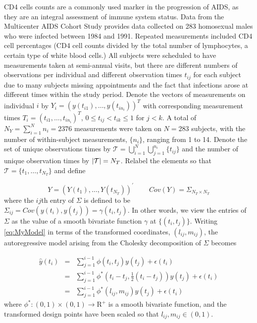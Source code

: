 CD4 cells counts are a commonly used marker in the progression of AIDS, as they are an integral assessment of immune system status. Data from the Multicenter AIDS Cohort Study provides data collected on 283 homosexual males who were infected between 1984 and 1991. Repeated measurements included CD4 cell percentages (CD4 cell counts divided by the total number of lymphocytes, a certain type of white blood cells.) All subjects were scheduled to have measurements taken at semi-annual visits, but there are different numbers of observations per individual and different observation times $t_{ij}$ for each subject due to many subjects missing appointments and the fact that infections arose at different times within the study period.  Denote the vectors of measurements on individual $i$ by $Y_i = \left( y\left(t_{i1}\right), \dots, y\left(t_{i n_i}\right) \right)^T$ with corresponding measurement times  $T_i = \left(t_{i1},\dots, t_{i n_i}  \right)^T$, $0 \le t_{ij} < t_{ik} \le 1$ for $j < k$. A total of $N_Y = \sum_{i=1}^N n_i = 2376$ measurements were taken on $N=283$ subjects, with the number of within-subject measurements, $\lbrace n_i \rbrace$, ranging from 1 to 14.  Denote the set of unique observations times by $ \mathcal{T} = \bigcup_{i=1}^N \bigcup_{j=1}^{n_i} \lbrace t_{ij} \rbrace$ and the number of unique observation times by $\vert \mathcal{T} \vert = N_T$. Relabel the elements so that $\mathcal{T} = \lbrace t_1, \dots, t_{N_T} \rbrace$ and define

\[
Y = \left(Y\left(t_1\right) , \dots, Y\left(t_{N_T} \right)\right)^\prime\;\;\;\;\;\;\;\; Cov\left(Y\right) = \Sigma_{N_T \times N_T}
\]
\noindent
where the $ij$th entry of $\Sigma$ is defined to be $\Sigma_{ij} = Cov\left(y\left(t_i\right), y\left(t_j\right)  \right) = \gamma\left(t_i,t_j\right)$. In other words, we view the entries of $\Sigma$ as the value of a smooth bivariate function $\gamma$ at $\lbrace \left(t_i,t_j\right) \rbrace$. Writing \eqref{eq:MyModel} in terms of the transformed coordinates, $\left(l_{ij}, m_{ij}\right)$, the autoregressive model arising from the Cholesky decomposition of $\Sigma$ becomes

\begin{eqnarray}   
\hat{y}\left(t_i\right)  &=& \sum_{j=1}^{i-1} \phi\left(t_i ,t_j\right) y\left({t_j}\right) + \epsilon\left({t_i}\right)\nonumber \\ 
&=& \sum_{j=1}^{i-1} \phi^*\left(t_i - t_j, \frac{1}{2}\left(t_i - t_j\right)\right) y\left({t_j}\right) + \epsilon\left({t_i}\right) \nonumber \\
&=& \sum_{j=1}^{i-1} \phi^*\left(l_{ij}, m_{ij}\right)  y\left({t_j}\right) + \epsilon\left({t_i}\right) \label{eq:MyTransformedModel}
\end{eqnarray}  
\noindent  
where $\phi^*:\left(0,1\right)\times \left(0,1\right)\rightarrow \mathrm{R}^+$ is a smooth bivariate function, and the transformed design points have been scaled so that $l_{ij},m_{ij} \in \left(0,1\right)$.

